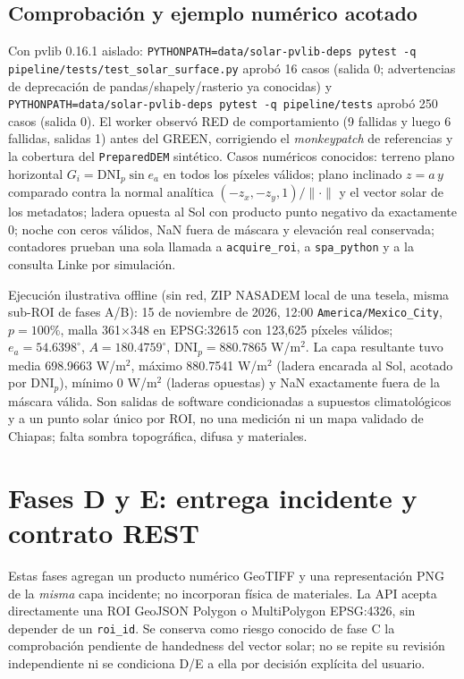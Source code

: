 \documentclass[11pt,a4paper]{article}
\begin{document}
\subsection{Comprobación y ejemplo numérico acotado}
Con pvlib 0.16.1 aislado: \texttt{PYTHONPATH=data/solar-pvlib-deps pytest -q pipeline/tests/test\_solar\_surface.py} aprobó 16 casos (salida 0; advertencias de deprecación de pandas/shapely/rasterio ya conocidas) y \texttt{PYTHONPATH=data/solar-pvlib-deps pytest -q pipeline/tests} aprobó 250 casos (salida 0). El worker observó RED de comportamiento (9 fallidas y luego 6 fallidas, salidas 1) antes del GREEN, corrigiendo el \emph{monkeypatch} de referencias y la cobertura del \texttt{PreparedDEM} sintético. Casos numéricos conocidos: terreno plano horizontal $G_i=\mathrm{DNI}_{p}\sin e_a$ en todos los píxeles válidos; plano inclinado $z=a\,y$ comparado contra la normal analítica $(-z_x,-z_y,1)/\|\cdot\|$ y el vector solar de los metadatos; ladera opuesta al Sol con producto punto negativo da exactamente 0; noche con ceros válidos, NaN fuera de máscara y elevación real conservada; contadores prueban una sola llamada a \texttt{acquire\_roi}, a \texttt{spa\_python} y a la consulta Linke por simulación.

Ejecución ilustrativa offline (sin red, ZIP NASADEM local de una tesela, misma sub-ROI de fases A/B): 15 de noviembre de 2026, 12:00 \texttt{America/Mexico\_City}, $p=100\%$, malla 361$\times$348 en EPSG:32615 con 123{,}625 píxeles válidos; $e_a=54.6398^\circ$, $A=180.4759^\circ$, $\mathrm{DNI}_{p}=880.7865$ W/m$^2$. La capa resultante tuvo media 698.9663 W/m$^2$, máximo 880.7541 W/m$^2$ (ladera encarada al Sol, acotado por $\mathrm{DNI}_{p}$), mínimo 0 W/m$^2$ (laderas opuestas) y NaN exactamente fuera de la máscara válida. Son salidas de software condicionadas a supuestos climatológicos y a un punto solar único por ROI, no una medición ni un mapa validado de Chiapas; falta sombra topográfica, difusa y materiales.

\section{Fases D y E: entrega incidente y contrato REST}
Estas fases agregan un producto numérico GeoTIFF y una representación PNG de la \emph{misma} capa incidente; no incorporan física de materiales. La API acepta directamente una ROI GeoJSON Polygon o MultiPolygon EPSG:4326, sin depender de un \texttt{roi\_id}. Se conserva como riesgo conocido de fase C la comprobación pendiente de handedness del vector solar; no se repite su revisión independiente ni se condiciona D/E a ella por decisión explícita del usuario.
\end{document}
